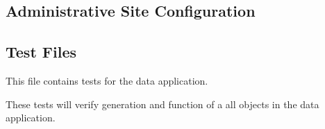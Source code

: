 \documentclass[letterpaper,10pt,english]{sphinxmanual}
\begin{document}
\label{api:module-data.urls}

\subsection{Administrative Site Configuration}
\label{api:administrative-site-configuration}\label{api:module-data.admin}

\subsection{Test Files}
\label{api:test-files}\label{api:module-data.tests}
This file contains tests for the data application.

These tests will verify generation and function of a all objects in the data application.
\end{document}
